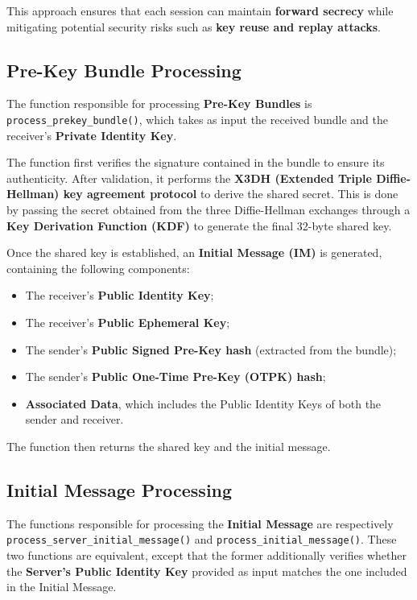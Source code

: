 This approach ensures that each session can maintain \textbf{forward secrecy} while mitigating potential security risks such as \textbf{key reuse and replay attacks}.

\subsection{Pre-Key Bundle Processing}
\label{subsec:Pre-KeyBundleProcessing}

The function responsible for processing \textbf{Pre-Key Bundles} is \texttt{process\_prekey\_bundle()}, which takes as input the received bundle and the receiver's \textbf{Private Identity Key}.

The function first verifies the signature contained in the bundle to ensure its authenticity. After validation, it performs the \textbf{X3DH (Extended Triple Diffie-Hellman) key agreement protocol} to derive the shared secret. This is done by passing the secret obtained from the three Diffie-Hellman exchanges through a \textbf{Key Derivation Function (KDF)} to generate the final 32-byte shared key.  

Once the shared key is established, an \textbf{Initial Message (IM)} is generated, containing the following components:  

\begin{itemize}  
    \item The receiver's \textbf{Public Identity Key};  
    \item The receiver's \textbf{Public Ephemeral Key};  
    \item The sender's \textbf{Public Signed Pre-Key hash} (extracted from the bundle);  
    \item The sender's \textbf{Public One-Time Pre-Key (OTPK) hash};  
    \item \textbf{Associated Data}, which includes the Public Identity Keys of both the sender and receiver.  
\end{itemize}  

The function then returns the shared key and the initial message.

\subsection{Initial Message Processing}
\label{subsec:InitialMessageProcessing}

The functions responsible for processing the \textbf{Initial Message} are respectively \\ \texttt{process\_server\_initial\_message()} and \texttt{process\_initial\_message()}. These two functions are equivalent, except that the former additionally verifies whether the \textbf{Server's Public Identity Key} provided as input matches the one included in the Initial Message.  

